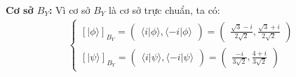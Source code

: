\textbf{Cơ sở $B_{Y}$:} Vì cơ sở $B_{Y}$ là cơ sở trực chuẩn, ta có:
\begin{align*}
    \begin{cases}
        [|\phi\rangle]_{B_{Y}} = \begin{pmatrix}
            \langle i|\phi\rangle,
            \langle -i|\phi\rangle
        \end{pmatrix} = \begin{pmatrix}
            \frac{\sqrt{3} - i}{2\sqrt{2}},
            \frac{\sqrt{3} + i}{2\sqrt{2}}
        \end{pmatrix}\\
        [|\psi\rangle]_{B_{Y}} = \begin{pmatrix}
            \langle i|\psi\rangle,
            \langle -i|\psi\rangle
        \end{pmatrix} = \begin{pmatrix}
            \frac{-i}{3\sqrt{2}},
            \frac{4 + i}{3\sqrt{2}}
        \end{pmatrix}
    \end{cases}
\end{align*}

